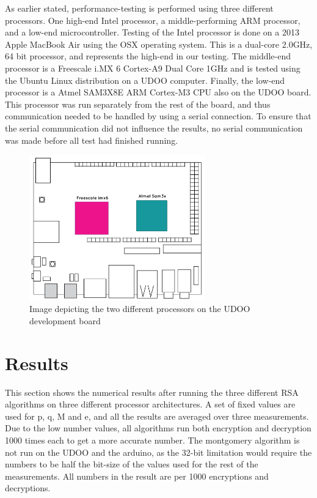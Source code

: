 \documentclass[twocolumn]{IEEEtran}
\begin{document}
As earlier stated, performance-testing is performed using three different processors. One high-end Intel processor, a middle-performing ARM processor, and a low-end microcontroller. Testing of the Intel processor is done on a 2013 Apple MacBook Air using the OSX operating system. This is a dual-core 2.0GHz, 64 bit processor, and represents the high-end in our testing. The middle-end processor is a Freescale i.MX 6 Cortex-A9 Dual Core 1GHz and is tested using the Ubuntu Linux distribution on a UDOO computer. Finally, the low-end processor is a Atmel SAM3X8E ARM Cortex-M3 CPU also on the UDOO board. This processor was run separately from the rest of the board, and thus communication needed to be handled by using a serial connection. To ensure that the serial communication did not influence the results, no serial communication was made before all test had finished running.

\begin{figure}[!htb] 
\begin{center} 
\includegraphics[width=3in]{UDOO_processors.png} 
\caption{Image depicting the two different processors on the UDOO development board} 
\label{fig:proc} 
\end{center} 
\end{figure}

\section{Results}
This section shows the numerical results after running the three different RSA algorithms on three different processor architectures. A set of fixed values are used for p, q, M and e, and all the results are averaged over three measurements. Due to the low number values, all algorithms run both encryption and decryption 1000 times each to get a more accurate number. The montgomery algorithm is not run on the UDOO and the arduino, as the 32-bit limitation would require the numbers to be half the bit-size of the values used for the rest of the measurements. All numbers in the result are per 1000 encryptions and decryptions.
\end{document}
